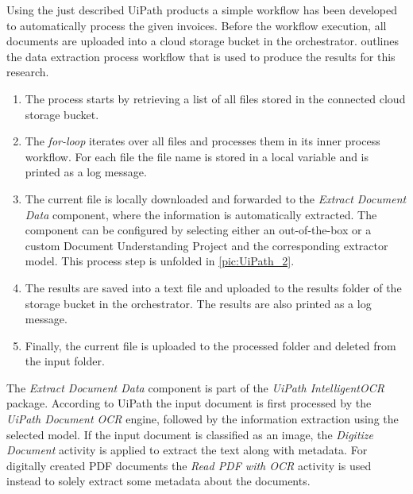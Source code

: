 Using the just described UiPath products a simple workflow has been developed to automatically process the given invoices.
Before the workflow execution, all documents are uploaded into a cloud storage bucket in the orchestrator.  outlines the data extraction process workflow that is used to produce the results for this research. 
\begin{enumerate}
    \item The process starts by retrieving a list of all files stored in the connected cloud storage bucket. 
    \item The \textit{for-loop} iterates over all files and processes them in its inner process workflow. For each file the file name is stored in a local variable and is printed as a log message. 
    \item The current file is locally downloaded and forwarded to the \textit{Extract Document Data} component, where the information is automatically extracted. The component can be configured by selecting either an out-of-the-box or a custom Document Understanding Project and the corresponding extractor model. This process step is unfolded in \cref{pic:UiPath_2}.
    \item The results are saved into a text file and uploaded to the results folder of the storage bucket in the orchestrator. The results are also printed as a log message. 
    \item Finally, the current file is uploaded to the processed folder and deleted from the input folder.
\end{enumerate}

The \textit{Extract Document Data} component is part of the \textit{UiPath IntelligentOCR} package. According to UiPath \cite{uipath,uipathdoc} the input document is first processed by the \textit{UiPath Document OCR} engine, followed by the information extraction using the selected model. If the input document is classified as an image, the \textit{Digitize Document} activity is applied to extract the text along with metadata. For digitally created PDF documents the \textit{Read PDF with OCR} activity is used instead to solely extract some metadata about the documents.

